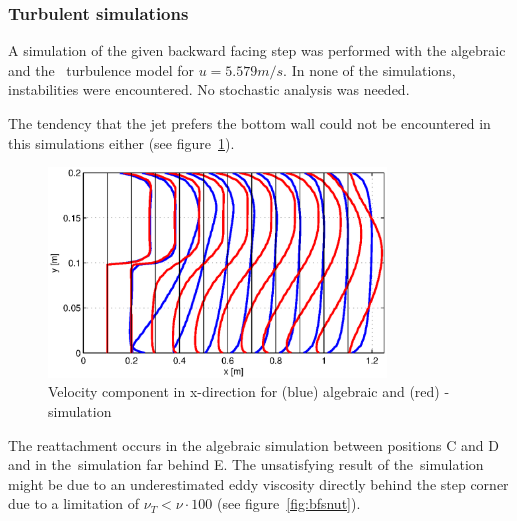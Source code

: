 \clearpage
\subsubsection*{Turbulent simulations}

A simulation of the given backward facing step was performed with the algebraic and the \ke\, turbulence model for $u=5.579m/s$. In none of the simulations, instabilities were encountered. No stochastic analysis was needed.

\noii The tendency that the jet prefers the bottom wall could not be encountered in this simulations either (see figure~\ref{fig:bfsprofile}).

\begin{figure}[!htb]
\centering
\includegraphics[trim=0 0 0 0,clip,width=0.8\textwidth]{FIGURES/bfs-profile.eps}
\caption{Velocity component in x-direction for (blue) algebraic and (red) \ke-simulation}
\label{fig:bfsprofile}
\end{figure} 



\noii The reattachment occurs in the algebraic simulation between positions C and D and in the \ke\,simulation far behind E. The unsatisfying result of the \ke\,simulation might be due to an underestimated eddy viscosity directly behind the step corner due to a limitation of $\nu_T<\nu\cdot 100$ (see figure~\ref{fig:bfsnut}).

